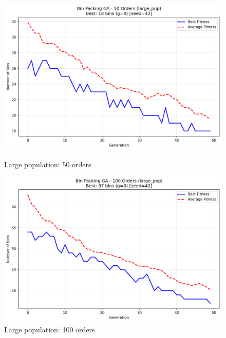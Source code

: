 \documentclass[journal,12pt,onecolumn]{IEEEtran}
\begin{document}
\begin{figure}[htbp]
\begin{minipage}{0.48\textwidth}
    \centering
    \includegraphics[width=\textwidth]{bpp_50items_large_pop_seed42.png}
    \caption{Large population: 50 orders}
    \label{fig:large_pop_50}
\end{minipage}\hfill
\begin{minipage}{0.48\textwidth}
    \centering
    \includegraphics[width=\textwidth]{bpp_100items_large_pop_seed42.png}
    \caption{Large population: 100 orders}
    \label{fig:large_pop_100}
\end{minipage}
\end{figure}
\end{document}
